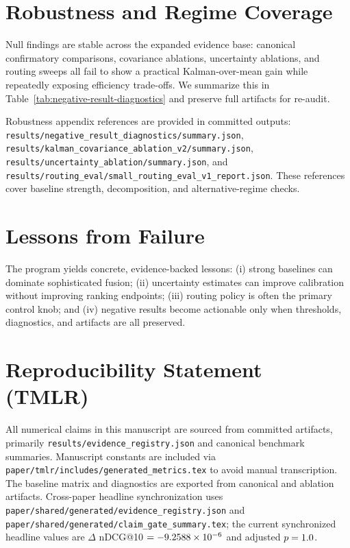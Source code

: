 \documentclass[10pt]{article}
\begin{document}
\section{Robustness and Regime Coverage}
Null findings are stable across the expanded evidence base: canonical confirmatory comparisons, covariance ablations, uncertainty ablations, and routing sweeps all fail to show a practical Kalman-over-mean gain while repeatedly exposing efficiency trade-offs. We summarize this in Table~\ref{tab:negative-result-diagnostics} and preserve full artifacts for re-audit.


Robustness appendix references are provided in committed outputs: \texttt{results/negative\_result\_diagnostics/summary.json}, \texttt{results/kalman\_covariance\_ablation\_v2/summary.json}, \texttt{results/uncertainty\_ablation/summary.json}, and \texttt{results/routing\_eval/small\_routing\_eval\_v1\_report.json}. These references cover baseline strength, decomposition, and alternative-regime checks.

\section{Lessons from Failure}



The program yields concrete, evidence-backed lessons: (i) strong baselines can dominate sophisticated fusion; (ii) uncertainty estimates can improve calibration without improving ranking endpoints; (iii) routing policy is often the primary control knob; and (iv) negative results become actionable only when thresholds, diagnostics, and artifacts are all preserved.

\section{Reproducibility Statement (TMLR)}
All numerical claims in this manuscript are sourced from committed artifacts, primarily \texttt{results/evidence\_registry.json} and canonical benchmark summaries. Manuscript constants are included via \texttt{paper/tmlr/includes/generated\_metrics.tex} to avoid manual transcription. The baseline matrix and diagnostics are exported from canonical and ablation artifacts.
Cross-paper headline synchronization uses \texttt{paper/shared/generated/evidence\_registry.json} and \texttt{paper/shared/generated/claim\_gate\_summary.tex}; the current synchronized headline values are $\Delta$ nDCG@10 $=-9.2588\times10^{-6}$ and adjusted $p=1.0$.
\end{document}
